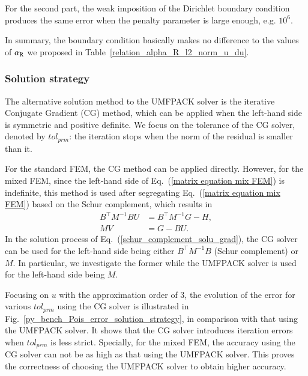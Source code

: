 \documentclass[review,3p]{elsarticle}
\begin{document}
For the second part, the weak imposition of the Dirichlet boundary condition produces the same error when the penalty parameter is large enough, e.g. $10^6$.

In summary, the boundary condition basically makes no difference to the values of $\alpha_{\rm R}$ we proposed in Table~\ref{relation_alpha_R_l2_norm_u_du}.

\subsubsection{Solution strategy}		\label{section_solver}

The alternative solution method to the UMFPACK solver is the iterative Conjugate Gradient (CG) method\cite{ginsburg1963cg}, which can be applied when the left-hand side is symmetric and positive definite. We focus on the tolerance of the CG solver, denoted by $tol_{prm}$: the iteration stops when the norm of the residual is smaller than it.

For the standard FEM, the CG method can be applied directly. However, for the mixed FEM, since the left-hand side of Eq.~(\ref{matrix equation mix FEM}) is indefinite, this method is used after segregating Eq.~(\ref{matrix equation mix FEM}) based on the Schur complement, which results in
\begin{subequations}
 \begin{align}
  B^{\top} M^{-1} B U &= B^{\top} M^{-1} G - H, 	\label{schur_complement_solution} \\
  MV&=G-BU.						\label{schur_complement_gradient}
\end{align}						\label{schur_complement_solu_grad}%
\end{subequations}
In the solution process of Eq.~(\ref{schur_complement_solu_grad}), the CG solver can be used for the left-hand side being either $B^{\top}M^{-1}B$ (Schur complement) or $M$. In particular, we investigate the former while the UMFPACK solver is used for the left-hand side being $M$.  

Focusing on $u$ with the approximation order of 3, the evolution of the error for various $tol_{prm}$ using the CG solver is illustrated in Fig.~\ref{py_bench_Pois_error_solution_strategy}, in comparison with that using the UMFPACK solver.
It shows that the CG solver introduces iteration errors when $tol_{prm}$ is less strict.
Specially, for the mixed FEM, the accuracy using the CG solver can not be as high as that using the UMFPACK solver. This proves the correctness of choosing the UMFPACK solver to obtain higher accuracy. 
\end{document}
